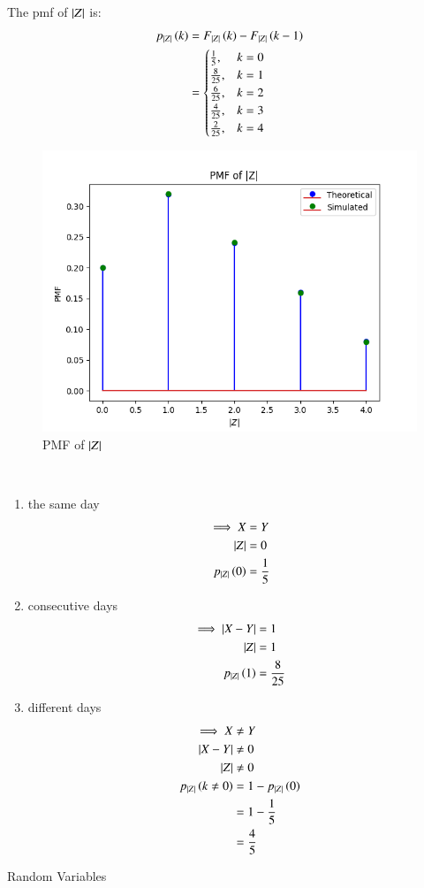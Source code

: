 \documentclass[journal,12pt,onecolumn]{IEEEtran}
\theoremstyle{remark}
\begin{document}
The pmf of $\left\vert Z\right\vert$ is:
\begin{align}
	p_{\left\vert Z\right\vert}\left(k\right) &= F_{\left\vert Z\right\vert}\left(k\right) - F_{\left\vert Z\right\vert}\left(k-1\right)\\
	&= \begin{cases}
		\frac{1}{5}, & k = 0\\
		\frac{8}{25}, & k = 1\\
		\frac{6}{25}, & k = 2\\
		\frac{4}{25}, & k = 3\\
		\frac{2}{25}, & k = 4
	\end{cases}
\end{align}
\begin{figure}[!ht]
\centering
\includegraphics[width=\columnwidth]{./figs/figure2.png}
\caption{PMF of $\left\vert Z\right\vert$}
\end{figure}
\\
\begin{enumerate}[label=(\roman*)]
	\item the same day
	\begin{align}
	\implies X &= Y\\
	\left\vert Z\right\vert &= 0\\
	p_{\left\vert Z\right\vert}\left(0\right) &= \frac{1}{5}
	\end{align}
	\item consecutive days
	\begin{align}
	\implies \left\vert X - Y\right\vert &= 1\\
	\left\vert Z\right\vert &= 1\\
	p_{\left\vert Z\right\vert}\left(1\right) &= \frac{8}{25}
	\end{align}
	\item different days
	\begin{align}
	\implies X &\neq Y\\
	\left\vert X - Y\right\vert &\neq 0\\
	\left\vert Z\right\vert &\neq 0 \\
	p_{\left\vert Z\right\vert}\left(k \neq 0\right) &= 1 - p_{\left\vert Z\right\vert}\left(0\right)\\
	&= 1 - \frac{1}{5}\\
	&= \frac{4}{5}
	\end{align}
\end{enumerate}

\begin{table}[!ht]                             
  
\caption{Random Variables}
\end{table}
\end{document}
